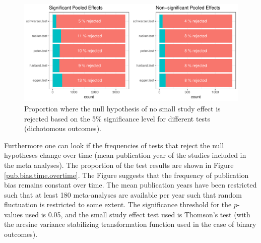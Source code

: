 \documentclass[11pt,a4paper,twoside]{book}\usepackage[]{graphicx}\usepackage[]{color}
\newenvironment{knitrout}{}{} %
\begin{document}
\begin{figure}
\begin{knitrout}
\color{fgcolor}

{\centering \includegraphics[width=\textwidth-3cm]{figure/ch02_figunnamed-chunk-29-1} 

}



\end{knitrout}
\caption{Proportion where the null hypothesis of no small study effect is rejected based on the 5\% significance level for different tests (dichotomous outcomes).}
\label{bias.results.bin.sep}
\end{figure}

Furthermore one can look if the frequencies of tests that reject the null hypotheses change over time (mean publication year of the studies included in the meta analyses). The proportion of the test results are shown in Figure \ref{pub.bias.time.overtime}. The Figure suggests that the frequency of publication bias remains constant over time. The mean publication years have been restricted such that at least 180 meta-analyses are available per year such that random fluctuation is restricted to some extent. The significance threshold for the $p$-values used is 0.05, and the small study effect test used is Thomson's test (with the arcsine variance stabilizing transformation function used in the case of binary outcomes).
\end{document}
